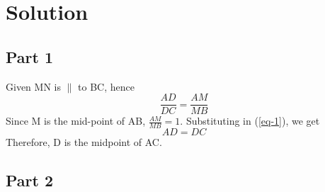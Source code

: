 \documentclass[journal,10pt,twocolumn]{article}
\begin{document}
\iffalse
\section*{Solution}

\subsection*{Part 1}
Given MN is $\parallel$ to BC, hence\\
\begin{equation}
\frac{AD}{DC} = \frac{AM}{MB}
\label{eq-1}
\end{equation}
Since M is the mid-point of AB, $\frac{AM}{MB} = 1$. Substituting in (\ref{eq-1}), we get\\
\begin{equation}
AD = DC
\label{eq-2}
\end{equation}
Therefore, D is the midpoint of AC.

\subsection*{Part 2}
\end{document}
